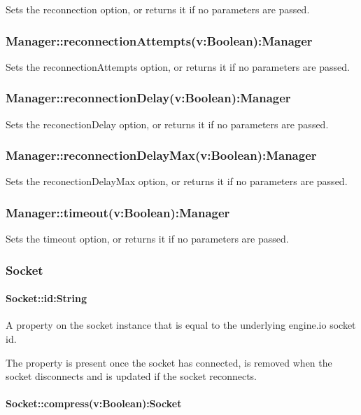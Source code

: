 Sets the {\ttfamily reconnection} option, or returns it if no parameters are passed.

\subsubsection*{Manager\+::reconnection\+Attempts(v\+:\+Boolean)\+:Manager}

Sets the {\ttfamily reconnection\+Attempts} option, or returns it if no parameters are passed.

\subsubsection*{Manager\+::reconnection\+Delay(v\+:\+Boolean)\+:Manager}

Sets the {\ttfamily reconection\+Delay} option, or returns it if no parameters are passed.

\subsubsection*{Manager\+::reconnection\+Delay\+Max(v\+:\+Boolean)\+:Manager}

Sets the {\ttfamily reconection\+Delay\+Max} option, or returns it if no parameters are passed.

\subsubsection*{Manager\+::timeout(v\+:\+Boolean)\+:Manager}

Sets the {\ttfamily timeout} option, or returns it if no parameters are passed.

\subsubsection*{Socket}

\paragraph*{Socket\+::id\+:String}

A property on the {\ttfamily socket} instance that is equal to the underlying engine.\+io socket id.

The property is present once the socket has connected, is removed when the socket disconnects and is updated if the socket reconnects.

\paragraph*{Socket\+::compress(v\+:\+Boolean)\+:Socket}

